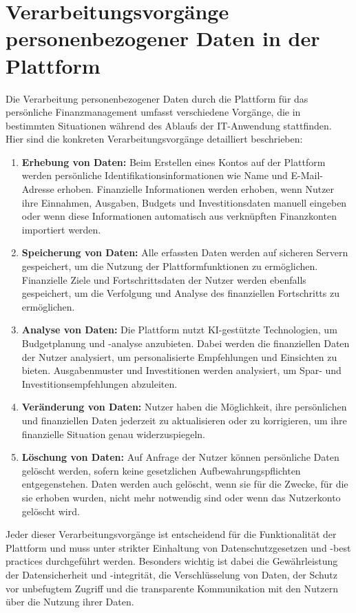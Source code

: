 \chapter{Verarbeitungsvorgänge personenbezogener Daten in der Plattform}

Die Verarbeitung personenbezogener Daten durch die Plattform für das persönliche Finanzmanagement umfasst verschiedene Vorgänge, die in bestimmten Situationen während des Ablaufs der IT-Anwendung stattfinden. Hier sind die konkreten Verarbeitungsvorgänge detailliert beschrieben:

\begin{enumerate}
    \item \textbf{Erhebung von Daten:}
        Beim Erstellen eines Kontos auf der Plattform werden persönliche Identifikationsinformationen wie Name und E-Mail-Adresse erhoben.
        Finanzielle Informationen werden erhoben, wenn Nutzer ihre Einnahmen, Ausgaben, Budgets und Investitionsdaten manuell eingeben oder wenn diese Informationen automatisch aus verknüpften Finanzkonten importiert werden.

    \item \textbf{Speicherung von Daten:}
        Alle erfassten Daten werden auf sicheren Servern gespeichert, um die Nutzung der Plattformfunktionen zu ermöglichen.
        Finanzielle Ziele und Fortschrittsdaten der Nutzer werden ebenfalls gespeichert, um die Verfolgung und Analyse des finanziellen Fortschritts zu ermöglichen.

    \item \textbf{Analyse von Daten:}
        Die Plattform nutzt KI-gestützte Technologien, um Budgetplanung und -analyse anzubieten. Dabei werden die finanziellen Daten der Nutzer analysiert, um personalisierte Empfehlungen und Einsichten zu bieten.
        Ausgabenmuster und Investitionen werden analysiert, um Spar- und Investitionsempfehlungen abzuleiten.

    \item \textbf{Veränderung von Daten:}
        Nutzer haben die Möglichkeit, ihre persönlichen und finanziellen Daten jederzeit zu aktualisieren oder zu korrigieren, um ihre finanzielle Situation genau widerzuspiegeln.

    \item \textbf{Löschung von Daten:}
        Auf Anfrage der Nutzer können persönliche Daten gelöscht werden, sofern keine gesetzlichen Aufbewahrungspflichten entgegenstehen. Daten werden auch gelöscht, wenn sie für die Zwecke, für die sie erhoben wurden, nicht mehr notwendig sind oder wenn das Nutzerkonto gelöscht wird.
\end{enumerate}

Jeder dieser Verarbeitungsvorgänge ist entscheidend für die Funktionalität der Plattform und muss unter strikter Einhaltung von Datenschutzgesetzen und -best practices durchgeführt werden. Besonders wichtig ist dabei die Gewährleistung der Datensicherheit und -integrität, die Verschlüsselung von Daten, der Schutz vor unbefugtem Zugriff und die transparente Kommunikation mit den Nutzern über die Nutzung ihrer Daten.